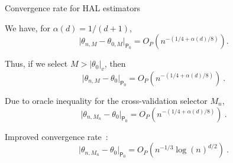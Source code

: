 \documentclass{beamer}
\begin{document}
\begin{frame}{Convergence rate for HAL estimators}
\vspace{0.25cm}

We have, for $\alpha(d)=1/(d+1)$,
\[
  \lvert \theta_{n,M} - \theta_{0,M} \rvert_{\mathsf{P}_0}=O_P(n^{-(1/4+\alpha(d)/8)}).
\]

Thus, if we select $M> \lvert \theta_0 \rvert_v$, then
\[
  \lvert \theta_{n,M} - \theta_{0} \rvert_{\mathsf{P}_0} =
  O_P(n^{-(1/4+\alpha(d)/8)})\ .
\]

Due to oracle inequality for the cross-validation selector $M_n$,
\[
  \lvert \theta_{n,M_n} - \theta_{0} \rvert_{\mathsf{P}_0} =
  O_P(n^{-(1/4+\alpha(d)/8)}) \ .
\]

Improved convergence rate~\citep{bibaut2019fast}:
\[
  \lvert \theta_{n,M_n} - \theta_{0} \rvert_{\mathsf{P}_0} =
  O_P(n^{-1/3} \log(n)^{d/2}) \ .
\]


\end{frame}

\end{document}
